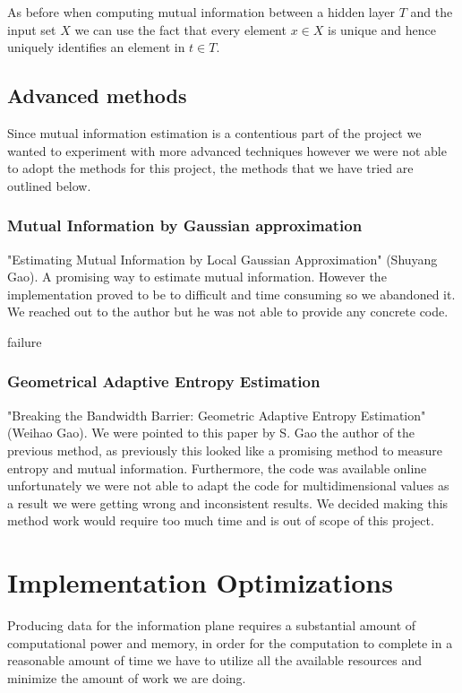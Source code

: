 As before when computing mutual information between a hidden layer $T$ and the
input set $X$ we can use the fact that every element $x\in X$ is unique and
hence uniquely identifies an element in $t\in T$.

\subsection{Advanced methods} \label{ssection:advanced}

Since mutual information estimation is a contentious part of the project we
wanted to experiment with more advanced techniques however we were not able to
adopt the methods for this project, the methods that we have tried are outlined
below.

\subsubsection{Mutual Information by Gaussian approximation}
  
  "Estimating Mutual Information by Local Gaussian Approximation" (Shuyang Gao). A
  promising way to estimate mutual information. However the implementation
  proved to be to difficult and time consuming so we abandoned it. We reached
  out to the author but he was not able to provide any concrete code.


  failure
\subsubsection{Geometrical Adaptive Entropy Estimation}

  "Breaking the Bandwidth Barrier: Geometric Adaptive Entropy Estimation"
  (Weihao Gao). We were pointed to this paper by S. Gao the author of the
  previous method, as previously this looked like a promising method to measure
  entropy and mutual information. Furthermore, the code was available online
  unfortunately we were not able to adapt the code for multidimensional values
  as a result we were getting wrong and inconsistent results. We decided making
  this method work would require too much time and is out of scope of this
  project.

\section{Implementation Optimizations}

Producing data for the information plane requires a substantial amount of
computational power and memory, in order for the computation to complete in a
reasonable amount of time we have to utilize all the available resources and
minimize the amount of work we are doing.

